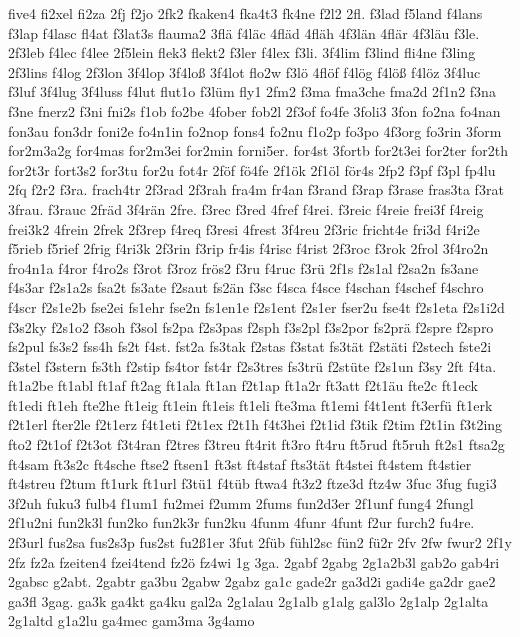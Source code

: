 {five4
fi2xel
fi2za
2fj
f2jo
2fk2
fkaken4
fka4t3
fk4ne
f2l2
2fl.
f3lad
f5land
f4lans
f3lap
f4lasc
fl4at
f3lat3s
flauma2
3flä
f4läc
4fläd
4fläh
4f3län
4flär
4f3läu
f3le.
2f3leb
f4lec
f4lee
2f5lein
flek3
flekt2
f3ler
f4lex
f3li.
3f4lim
f3lind
fli4ne
f3ling
2f3lins
f4log
2f3lon
3f4lop
3f4loß
3f4lot
flo2w
f3lö
4flöf
f4lög
f4löß
f4löz
3f4luc
f3luf
3f4lug
3f4luss
f4lut
flut1o
f3lüm
fly1
2fm2
f3ma
fma3che
fma2d
2f1n2
f3na
f3ne
fnerz2
f3ni
fni2s
f1ob
fo2be
4fober
fob2l
2f3of
fo4fe
3foli3
3fon
fo2na
fo4nan
fon3au
fon3dr
foni2e
fo4n1in
fo2nop
fons4
fo2nu
f1o2p
fo3po
4f3org
fo3rin
3form
for2m3a2g
for4mas
for2m3ei
for2min
forni5er.
for4st
3fortb
for2t3ei
for2ter
for2th
for2t3r
fort3s2
for3tu
for2u
fot4r
2föf
fö4fe
2f1ök
2f1öl
för4s
2fp2
f3pf
f3pl
fp4lu
2fq
f2r2
f3ra.
frach4tr
2f3rad
2f3rah
fra4m
fr4an
f3rand
f3rap
f3rase
fras3ta
f3rat
3frau.
f3rauc
2fräd
3f4rän
2fre.
f3rec
f3red
4fref
f4rei.
f3reic
f4reie
frei3f
f4reig
frei3k2
4frein
2frek
2f3rep
f4req
f3resi
4frest
3f4reu
2f3ric
fricht4e
fri3d
f4ri2e
f5rieb
f5rief
2frig
f4ri3k
2f3rin
f3rip
fr4is
f4risc
f4rist
2f3roc
f3rok
2frol
3f4ro2n
fro4n1a
f4ror
f4ro2s
f3rot
f3roz
frös2
f3ru
f4ruc
f3rü
2f1s
f2s1al
f2sa2n
fs3ane
f4s3ar
f2s1a2s
fsa2t
fs3ate
f2saut
fs2än
f3sc
f4sca
f4sce
f4schan
f4schef
f4schro
f4scr
f2s1e2b
fse2ei
fs1ehr
fse2n
fs1en1e
f2s1ent
f2s1er
fser2u
fse4t
f2s1eta
f2s1i2d
f3s2ky
f2s1o2
f3soh
f3sol
fs2pa
f2s3pas
f2sph
f3s2pl
f3s2por
fs2prä
f2spre
f2spro
fs2pul
fs3s2
fss4h
fs2t
f4st.
fst2a
fs3tak
f2stas
f3stat
fs3tät
f2stäti
f2stech
fste2i
f3stel
f3stern
fs3th
f2stip
fs4tor
fst4r
f2s3tres
fs3trü
f2stüte
f2s1un
f3sy
2ft
f4ta.
ft1a2be
ft1abl
ft1af
ft2ag
ft1ala
ft1an
f2t1ap
ft1a2r
ft3att
f2t1äu
fte2c
ft1eck
ft1edi
ft1eh
fte2he
ft1eig
ft1ein
ft1eis
ft1eli
fte3ma
ft1emi
f4t1ent
ft3erfü
ft1erk
f2t1erl
fter2le
f2t1erz
f4t1eti
f2t1ex
f2t1h
f4t3hei
f2t1id
f3tik
f2tim
f2t1in
f3t2ing
fto2
f2t1of
f2t3ot
f3t4ran
f2tres
f3treu
ft4rit
ft3ro
ft4ru
ft5rud
ft5ruh
ft2s1
ftsa2g
ft4sam
ft3s2c
ft4sche
ftse2
ftsen1
ft3st
ft4staf
fts3tät
ft4stei
ft4stem
ft4stier
ft4streu
f2tum
ft1urk
ft1url
f3tü1
f4tüb
ftwa4
ft3z2
ftze3d
ftz4w
3fuc
3fug
fugi3
3f2uh
fuku3
fulb4
f1um1
fu2mei
f2umm
2fums
fun2d3er
2f1unf
fung4
2fungl
2f1u2ni
fun2k3l
fun2ko
fun2k3r
fun2ku
4funm
4funr
4funt
f2ur
furch2
fu4re.
2f3url
fus2sa
fus2s3p
fus2st
fu2ß1er
3fut
2füb
fühl2sc
fün2
fü2r
2fv
2fw
fwur2
2f1y
2fz
fz2a
fzeiten4
fzei4tend
fz2ö
fz4wi
1g
3ga.
2gabf
2gabg
2g1a2b3l
gab2o
gab4ri
2gabsc
g2abt.
2gabtr
ga3bu
2gabw
2gabz
ga1c
gade2r
ga3d2i
gadi4e
ga2dr
gae2
ga3fl
3gag.
ga3k
ga4kt
ga4ku
gal2a
2g1alau
2g1alb
g1alg
gal3lo
2g1alp
2g1alta
2g1altd
g1a2lu
ga4mec
gam3ma
3g4amo
}
